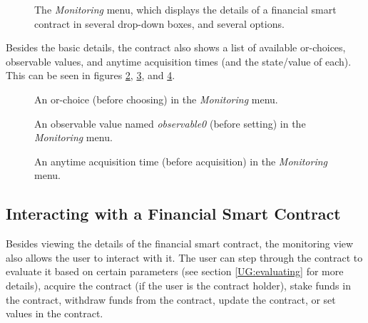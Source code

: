 \documentclass{article}
\begin{document}
\begin{figure}[h]
    \centering
    \caption{The \textit{Monitoring} menu, which displays the details of a financial smart contract in several drop-down boxes, and several options.}
    \label{UG:fig:monitoring}
\end{figure}

Besides the basic details, the contract also shows a list of available or-choices, observable values, and anytime acquisition times (and the state/value of each). This can be seen in figures \ref{UG:fig:monitoring-or}, \ref{UG:fig:monitoring-obs}, and \ref{UG:fig:monitoring-anytime}.

\begin{figure}[h]
    \centering
    \caption{An or-choice (before choosing) in the \textit{Monitoring} menu.}
    \label{UG:fig:monitoring-or}
\end{figure}

\begin{figure}[h]
    \centering
    \caption{An observable value named \textit{observable0} (before setting) in the \textit{Monitoring} menu.}
    \label{UG:fig:monitoring-obs}
\end{figure}

\begin{figure}[h]
    \centering
    \caption{An anytime acquisition time (before acquisition) in the \textit{Monitoring} menu.}
    \label{UG:fig:monitoring-anytime}
\end{figure}

\subsection{Interacting with a Financial Smart Contract}

Besides viewing the details of the financial smart contract, the monitoring view also allows the user to interact with it. The user can step through the contract to evaluate it based on certain parameters (see section \ref{UG:evaluating} for more details), acquire the contract (if the user is the contract holder), stake funds in the contract, withdraw funds from the contract, update the contract, or set values in the contract.
\end{document}
